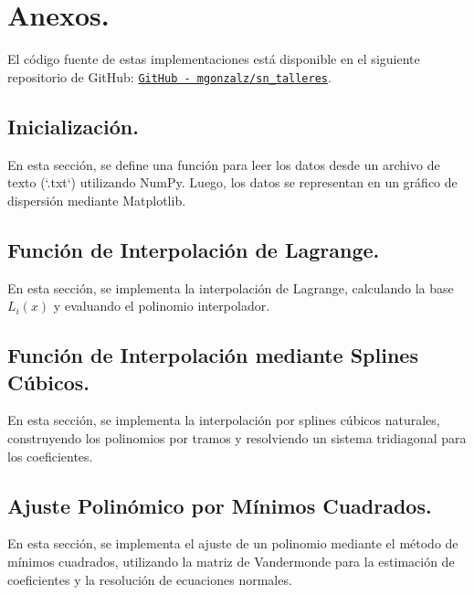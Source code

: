 \documentclass{article}
\begin{document}
\newpage
\section{Anexos.}
El código fuente de estas implementaciones está disponible en el siguiente repositorio de GitHub:  
\href{https://github.com/mgonzalz/sn_talleres/blob/main/notebooks/informe-01__interp_regresion.ipynb}{\texttt{GitHub - mgonzalz/sn\_talleres}}.

\subsection{Inicialización.}
En esta sección, se define una función para leer los datos desde un archivo de texto (`.txt`) utilizando NumPy. Luego, los datos se representan en un gráfico de dispersión mediante Matplotlib.


\subsection{Función de Interpolación de Lagrange.}
En esta sección, se implementa la interpolación de Lagrange, calculando la base \(L_i(x)\) y evaluando el polinomio interpolador.



\newpage
\subsection{Función de Interpolación mediante Splines Cúbicos.}
En esta sección, se implementa la interpolación por splines cúbicos naturales, construyendo los polinomios por tramos y resolviendo un sistema tridiagonal para los coeficientes.



\newpage
\subsection{Ajuste Polinómico por Mínimos Cuadrados.}
En esta sección, se implementa el ajuste de un polinomio mediante el método de mínimos cuadrados, utilizando la matriz de Vandermonde para la estimación de coeficientes y la resolución de ecuaciones normales.
\end{document}
